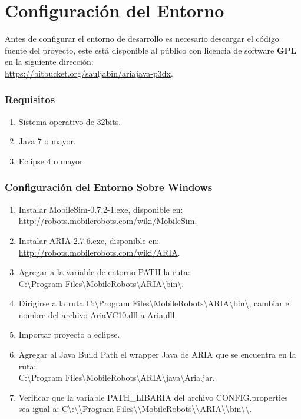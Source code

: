 \documentclass[11pt,twoside,A5]{article}
\newcommand{\sourcecode}[2][\footnotesize]{{\ttfamily#1#2}}
\newcommand{\link}[1]{{\footnotesize\url{#1}}}
\begin{document}
\section*{Configuración del Entorno}

Antes de configurar el entorno de desarrollo es necesario descargar el código fuente del proyecto,
este está disponible al público con licencia de software \textbf{GPL} en la siguiente dirección:
\\ \link{https://bitbucket.org/sauljabin/ariajava-p3dx}.

\subsubsection*{Requisitos}
\begin{enumerate}
\item Sistema operativo de 32bits.
\item Java 7 o mayor.
\item Eclipse 4 o mayor.
\end{enumerate}

\subsubsection*{Configuración del Entorno Sobre Windows}

\begin{enumerate}
\item Instalar \sourcecode{MobileSim-0.7.2-1.exe}, disponible en: \\ \link{http://robots.mobilerobots.com/wiki/MobileSim}.
\item Instalar \sourcecode{ARIA-2.7.6.exe}, disponible en: \\ \link{http://robots.mobilerobots.com/wiki/ARIA}.
\item Agregar a la variable de entorno \sourcecode{PATH} la ruta: \\ \sourcecode{C:\textbackslash Program Files\textbackslash MobileRobots\textbackslash ARIA\textbackslash bin\textbackslash}.
\item Dirigirse a la ruta \sourcecode{C:\textbackslash Program Files\textbackslash MobileRobots\textbackslash ARIA\textbackslash bin\textbackslash}, cambiar el nombre del archivo
\sourcecode{AriaVC10.dll} a  \sourcecode{Aria.dll}.
\item Importar proyecto a eclipse.
\item Agregar al \sourcecode{Java Build Path} el wrapper Java de ARIA que se encuentra en la ruta: \\ \sourcecode{C:\textbackslash Program Files\textbackslash MobileRobots\textbackslash ARIA\textbackslash java\textbackslash Aria.jar}.
\item Verificar que la variable  \sourcecode{PATH\_LIBARIA} del archivo  \sourcecode{CONFIG.properties} 
	  sea igual a:  \sourcecode{C\textbackslash:\textbackslash\textbackslash Program Files\textbackslash\textbackslash MobileRobots\textbackslash\textbackslash ARIA\textbackslash\textbackslash bin\textbackslash\textbackslash }.
\end{enumerate}
\end{document}
